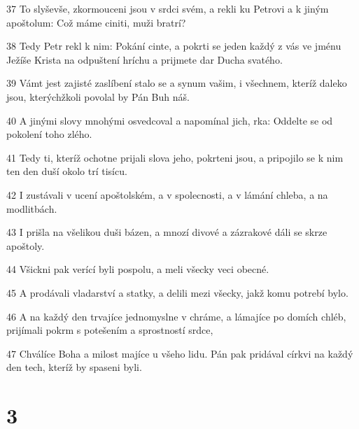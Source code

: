 \par 37 To slyševše, zkormouceni jsou v srdci svém, a rekli ku Petrovi a k jiným apoštolum: Což máme ciniti, muži bratrí?
\par 38 Tedy Petr rekl k nim: Pokání cinte, a pokrti se jeden každý z vás ve jménu Ježíše Krista na odpuštení hríchu a prijmete dar Ducha svatého.
\par 39 Vámt jest zajisté zaslíbení stalo se a synum vašim, i všechnem, kteríž daleko jsou, kterýchžkoli povolal by Pán Buh náš.
\par 40 A jinými slovy mnohými osvedcoval a napomínal jich, rka: Oddelte se od pokolení toho zlého.
\par 41 Tedy ti, kteríž ochotne prijali slova jeho, pokrteni jsou, a pripojilo se k nim ten den duší okolo trí tisícu.
\par 42 I zustávali v ucení apoštolském, a v spolecnosti, a v lámání chleba, a na modlitbách.
\par 43 I prišla na všelikou duši bázen, a mnozí divové a zázrakové dáli se skrze apoštoly.
\par 44 Všickni pak verící byli pospolu, a meli všecky veci obecné.
\par 45 A prodávali vladarství a statky, a delili mezi všecky, jakž komu potrebí bylo.
\par 46 A na každý den trvajíce jednomyslne v chráme, a lámajíce po domích chléb, prijímali pokrm s potešením a sprostností srdce,
\par 47 Chválíce Boha a milost majíce u všeho lidu. Pán pak pridával církvi na každý den tech, kteríž by spaseni byli.

\chapter{3}

